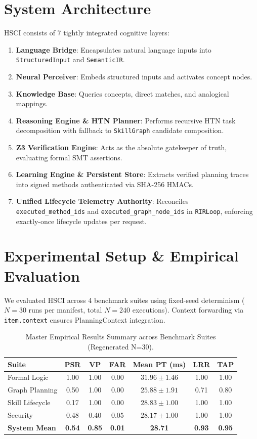 \documentclass[letterpaper]{article}
\begin{document}
\section{System Architecture}
HSCI consists of 7 tightly integrated cognitive layers:
\begin{enumerate}
    \item \textbf{Language Bridge}: Encapsulates natural language inputs into \texttt{StructuredInput} and \texttt{SemanticIR}.
    \item \textbf{Neural Perceiver}: Embeds structured inputs and activates concept nodes.
    \item \textbf{Knowledge Base}: Queries concepts, direct matches, and analogical mappings.
    \item \textbf{Reasoning Engine \& HTN Planner}: Performs recursive HTN task decomposition with fallback to \texttt{SkillGraph} candidate composition.
    \item \textbf{Z3 Verification Engine}: Acts as the absolute gatekeeper of truth, evaluating formal SMT assertions.
    \item \textbf{Learning Engine \& Persistent Store}: Extracts verified planning traces into signed methods authenticated via SHA-256 HMACs.
    \item \textbf{Unified Lifecycle Telemetry Authority}: Reconciles \texttt{executed\_method_ids} and \texttt{executed\_graph\_node_ids} in \texttt{RIRLoop}, enforcing exactly-once lifecycle updates per request.
\end{enumerate}

\section{Experimental Setup \& Empirical Evaluation}
We evaluated HSCI across 4 benchmark suites using fixed-seed determinism ($N=30$ runs per manifest, total $N=240$ executions). Context forwarding via \texttt{item.context} ensures PlanningContext integration.

\begin{table}[h!]
\centering
\caption{Master Empirical Results Summary across Benchmark Suites (Regenerated N=30).}
\begin{tabular}{lcccccc}
\hline
\textbf{Suite} & \textbf{PSR} & \textbf{VP} & \textbf{FAR} & \textbf{Mean PT (ms)} & \textbf{LRR} & \textbf{TAP} \\
\hline
Formal Logic & 1.00 & 1.00 & 0.00 & $31.96 \pm 1.46$ & 1.00 & 1.00 \\
Graph Planning & 0.50 & 1.00 & 0.00 & $25.88 \pm 1.91$ & 0.71 & 0.80 \\
Skill Lifecycle & 0.17 & 1.00 & 0.00 & $28.83 \pm 1.00$ & 1.00 & 1.00 \\
Security & 0.48 & 0.40 & 0.05 & $28.17 \pm 1.00$ & 1.00 & 1.00 \\
\hline
\textbf{System Mean} & \textbf{0.54} & \textbf{0.85} & \textbf{0.01} & \textbf{28.71} & \textbf{0.93} & \textbf{0.95} \\
\hline
\end{tabular}
\end{table}
\end{document}
